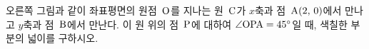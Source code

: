 \noindent\begin{minipage}[t]{0.58\linewidth}\vspace{0pt}\raggedright 오른쪽 그림과 같이 좌표평면의 원점~$\mathrm{O}$를 지나는 원~$\mathrm{C}$가 $x$축과 점~$\mathrm{A}(2,\,0)$에서 만나고 $y$축과 점~$\mathrm{B}$에서 만난다. 이 원 위의 점~$\mathrm{P}$에 대하여 $\angle\mathrm{OPA}=45^\circ$일 때, 색칠한 부분의 넓이를 구하시오.\end{minipage}\hfill\begin{minipage}[t]{0.4\linewidth}\vspace{0pt}\centering \resizebox{\ifdim\width>\linewidth\linewidth\else\width\fi}{!}{}\end{minipage}\par
